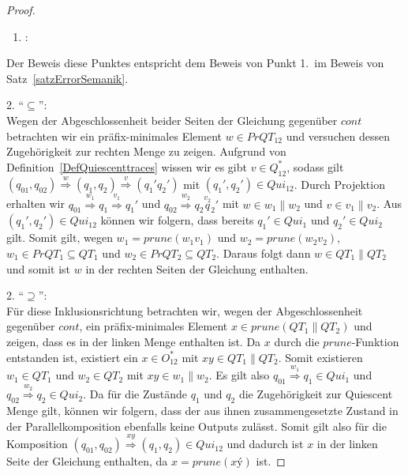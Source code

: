 \begin{proof}
  ~
  \begin{enumerate}
    \item \hspace{-0.2cm}:
  \end{enumerate}
  \vspace{-0.3cm}
  Der Beweis diese Punktes entspricht dem Beweis von Punkt 1.\ im Beweis von
  Satz~\ref{satzErrorSemanik}.

  2. ``$\subseteq$'':\\
  Wegen der Abgeschlossenheit beider Seiten der Gleichung gegenüber $cont$
  betrachten wir ein präfix-minimales Element $w\in PrQT_{12}$ und versuchen dessen
  Zugehörigkeit zur rechten Menge zu zeigen. Aufgrund von
  Definition~\ref{DefQuiescenttraces} wissen wir es gibt $v\in Q_{12}^*$,
  sodass gilt $(q_{01},q_{02}) \overset{w}{\Rightarrow} (q_1,q_2)
  \overset{v}{\Rightarrow} (q_1'q_2')$ mit $(q_1',q_2')\in Qui_{12}$. Durch
  Projektion erhalten wir $q_{01} \overset{w_1}{\Rightarrow} q_1
  \overset{v_1}{\Rightarrow} q_1'$ und $q_{02} \overset{w_2}{\Rightarrow} q_2
  \overset{v_2} q_2'$ mit $w\in w_1\|w_2$ und $v\in v_1\|v_2$. Aus
  $(q_1',q_2')\in Qui_{12}$ können wir folgern, dass bereits $q_1'\in Qui_1$
  und $q_2'\in Qui_2$ gilt. Somit gilt, wegen $w_1=prune(w_1v_1)$ und
  $w_2=prune(w_2v_2)$, $w_1\in PrQT_1\subseteq QT_1$ und $w_2\in
  PrQT_2\subseteq QT_2$. Daraus folgt dann $w\in QT_1\|QT_2$ und somit ist $w$
  in der rechten Seiten der Gleichung enthalten.

  2. ``$\supseteq$'':\\
  Für diese Inklusionsrichtung betrachten wir, wegen der Abgeschlossenheit
  gegenüber $cont$, ein präfix-minimales Element $x\in prune(QT_1\|QT_2)$ und
  zeigen, dass es in der linken Menge enthalten ist. Da $x$ durch die
  $prune$-Funktion entstanden ist, existiert ein $x\in O_{12}^*$ mit $xy\in
  QT_1\|QT_2$. Somit existieren $w_1\in QT_1$ und $w_2\in QT_2$ mit $xy\in
  w_1\|w_2$. Es gilt also $q_{01} \overset{w_1}{\Rightarrow}
  q_1\in Qui_1$ und $q_{02} \overset{w_2}{\Rightarrow} q_2\in Qui_2$. Da für
  die Zustände $q_1$ und $q_2$ die Zugehörigkeit zur Quiescent Menge gilt,
  können wir folgern, dass der aus ihnen zusammengesetzte Zustand in der
  Parallelkomposition ebenfalls keine Outputs zulässt. Somit gilt also für die
  Komposition $(q_{01},q_{02}) \overset{xy}{\Rightarrow} (q_1,q_2)\in Qui_{12}$
  und dadurch ist $x$ in der linken Seite der Gleichung enthalten, da
  $x=prune(xý)$ ist.


\end{proof}

